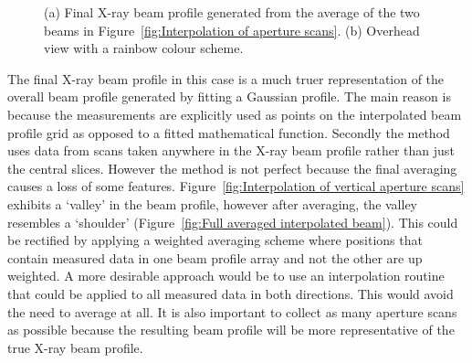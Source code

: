 \begin{figure}
\begin{subfigure}[b]{0.75\textwidth}
            \caption{}
            \label{fig:Overhead averaged interpolated interpolated beam}
    \end{subfigure}
    \caption{(a) Final X-ray beam profile generated from the average of the two beams in Figure~\ref{fig:Interpolation of aperture scans}.
    (b) Overhead view with a rainbow colour scheme.}
    \label{fig:Averaged Beam Profile}
\end{figure}

The final X-ray beam profile in this case is a much truer representation of the overall beam profile generated by fitting a Gaussian profile.
The main reason is because the measurements are explicitly used as points on the interpolated beam profile grid as opposed to a fitted mathematical function.
Secondly the method uses data from scans taken anywhere in the X-ray beam profile rather than just the central slices.
However the method is not perfect because the final averaging causes a loss of some features.
Figure~\ref{fig:Interpolation of vertical aperture scans} exhibits a `valley' in the beam profile, however after averaging, the valley resembles a `shoulder' (Figure~\ref{fig:Full averaged interpolated beam}).
This could be rectified by applying a weighted averaging scheme where positions that contain measured data in one beam profile array and not the other are up weighted.
A more desirable approach would be to use an interpolation routine that could be applied to all measured data in both directions.
This would avoid the need to average at all.
It is also important to collect as many aperture scans as possible because the resulting beam profile will be more representative of the true X-ray beam profile.
